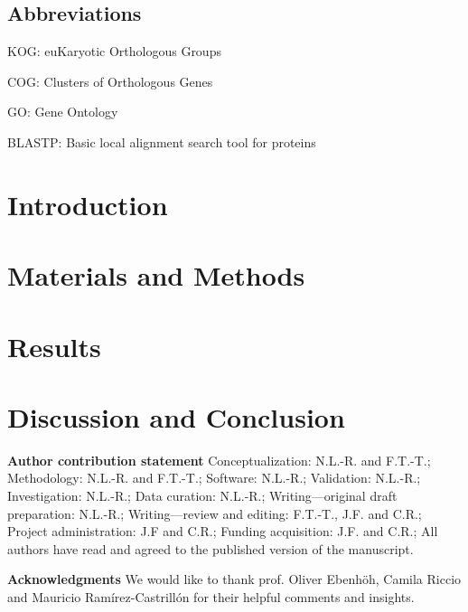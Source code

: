 \documentclass[referee,pdflatex,sn-basic]{sn-jnl}%
\theoremstyle{thmstyleone}%
\theoremstyle{thmstyletwo}%
\theoremstyle{thmstylethree}%
\begin{document}
\maketitle

\subsection*{Abbreviations}

KOG: euKaryotic Orthologous Groups

COG: Clusters of Orthologous Genes

GO: Gene Ontology

BLASTP: Basic local alignment search tool for proteins

\section{Introduction}
\label{sec:intro}



\section{Materials and Methods}
\label{sec:method}



\section{Results}
\label{sec:results}



\section{Discussion and Conclusion}
\label{sec:conclusion}







\backmatter

\vspace{1in}

\textbf{Author contribution statement} Conceptualization: N.L.-R. and 
F.T.-T.; Methodology: N.L.-R. and F.T.-T.; Software: N.L.-R.; 
Validation: N.L.-R.; Investigation: N.L.-R.; 
Data curation: N.L.-R.; 
Writing---original draft preparation: N.L.-R.; 
Writing---review and editing: F.T.-T., J.F. and C.R.; 
Project administration: J.F and C.R.; 
Funding acquisition: J.F. and C.R.;
All authors have read and agreed to the published version of the 
manuscript.

\textbf{Acknowledgments}
We would like to thank prof. Oliver Ebenhöh, Camila Riccio and 
Mauricio Ramírez-Castrillón for their helpful comments and 
insights.
\end{document}

